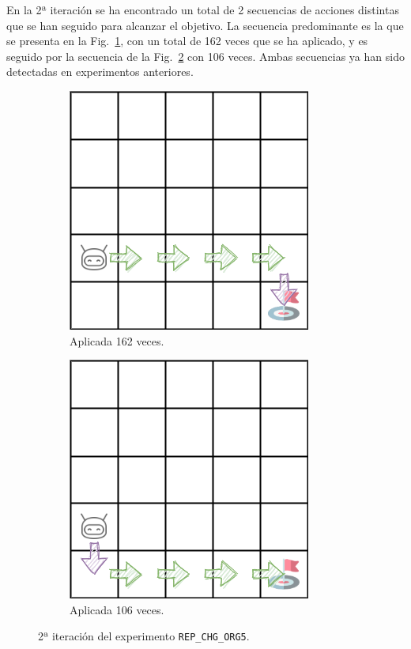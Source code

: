 En la 2ª iteración se ha encontrado un total de 2 secuencias de acciones distintas que se han seguido para alcanzar el objetivo. La secuencia predominante es la que se presenta en la Fig.~\ref{fig:dim5_CHANGE_ORIGIN-20_09-00_57-2, 1, 0_162}, con un total de 162 veces que se ha aplicado, y es seguido por la secuencia de la Fig.~\ref{fig:dim5_CHANGE_ORIGIN-20_09-00_57-2, 1, 0_106} con 106 veces. Ambas secuencias ya han sido detectadas en experimentos anteriores. \\


\begin{figure}
    \centering
    \begin{subfigure}{.5\textwidth}
        \centering
        \includegraphics[scale=0.4]{cap5_experimentacion/images/dim5_CHANGE_ORIGIN-20_09-00_52-1, 0, 2_139.png}
        \caption{Aplicada 162 veces.}
        \label{fig:dim5_CHANGE_ORIGIN-20_09-00_57-2, 1, 0_162}
    \end{subfigure}%
    \begin{subfigure}{.5\textwidth}
        \centering
        \includegraphics[scale=0.4]{cap5_experimentacion/images/dim5_CHANGE_ORIGIN-20_09-00_52-1, 0, 2_6.png}
        \caption{Aplicada 106 veces.}
        \label{fig:dim5_CHANGE_ORIGIN-20_09-00_57-2, 1, 0_106}
    \end{subfigure}
    \caption{2ª iteración del experimento \texttt{REP\_CHG\_ORG5}.}
    \label{fig:dim5_CHANGE_ORIGIN-20_09-00_52-2, 1, 0_2iter}
\end{figure}

